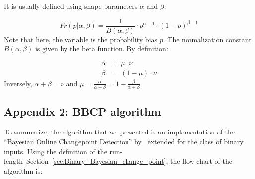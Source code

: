 \documentclass[10pt,letterpaper]{article}
\newcommand{\eq}[1]{\begin{equation*}#1\end{equation*}}
\newcommand{\eqs}[1]{\begin{align*}#1\end{align*}}
\newcommand{\citet}[1]{\cite{#1}}
\newcommand{\seeSec}[1]{Section~\ref{sec:#1}}
\begin{document}
It is usually defined using shape parameters $\alpha$ and $\beta$:

\eq{
Pr(p | \alpha, \beta ) = \frac{1}{B(\alpha, \beta)} \cdot p^{\alpha -1} \cdot (1-p)^{\beta - 1}
}
Note that here, the variable is the probability bias $p$. The normalization constant $B(\alpha, \beta)$ is given by the beta function. By definition:

\eqs{
        \alpha &= \mu \cdot \nu \\
        \beta  &= (1-\mu) \cdot \nu
    }
Inversely, $\alpha + \beta = \nu$ and $\mu = \frac{\alpha}{\alpha +\beta} = 1- \frac{\beta}{\alpha + \beta}$


\subsection{Appendix 2: BBCP algorithm}
\label{app:bcp}

To summarize, the algorithm that we presented is an implementation of the  ``Bayesian Online Changepoint Detection'' by~\citet{AdamsMackay2007}
extended for the class of binary inputs. Using the definition of the run-length~\seeSec{Binary_Bayesian_change_point}, the flow-chart of the algorithm is:
\end{document}
